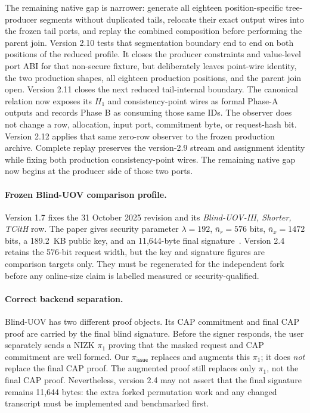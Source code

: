 \documentclass[11pt]{article}
\begin{document}
The remaining native gap is narrower: generate all eighteen position-specific
tree-producer segments without duplicated tails, relocate their exact output
wires into the frozen tail ports, and replay the combined composition before
performing the parent join.
Version 2.10 tests that segmentation boundary end to end on both positions of
the reduced profile.  It closes the producer constraints and value-level port
ABI for that non-secure fixture, but deliberately leaves point-wire identity,
the two production shapes, all eighteen production positions, and the parent
join open.
Version 2.11 closes the next reduced tail-internal boundary.  The canonical
relation now exposes its $H_1$ and consistency-point wires as formal Phase-A
outputs and records Phase B as consuming those same IDs.  The observer does not
change a row, allocation, input port, commitment byte, or request-hash bit.
Version 2.12 applies that same zero-row observer to the frozen production
archive.  Complete replay preserves the version-2.9 stream and assignment
identity while fixing both production consistency-point wires.  The remaining
native gap now begins at the producer side of those two ports.

\paragraph{Frozen Blind-UOV comparison profile.}
Version 1.7 fixes the 31 October 2025 revision and its
\emph{Blind-UOV-III, Shorter, TCitH} row.  The paper gives security parameter
$\lambda=192$, $\bar n_r=576$ bits, $\bar n_x=1472$ bits, a 189.2~KB public
key, and an 11,644-byte final signature~\cite{blind-uov}.  Version 2.4 retains
the 576-bit request width, but the key and signature figures are comparison
targets only.  They must be regenerated for the independent fork before any
online-size claim is labelled measured or security-qualified.

\paragraph{Correct backend separation.}
Blind-UOV has two different proof objects.  Its CAP commitment and final CAP
proof are carried by the final blind signature.  Before the signer responds,
the user separately sends a NIZK $\pi_1$ proving that the masked request and
CAP commitment are well formed.  Our $\pi_{\mathsf{issue}}$ replaces and
augments this $\pi_1$; it does \emph{not} replace the final CAP proof.
The augmented proof still replaces only $\pi_1$, not the final CAP proof.
Nevertheless, version 2.4 may not assert that the final signature remains
11,644 bytes: the extra forked permutation work and any changed transcript must
be implemented and benchmarked first.
\end{document}
